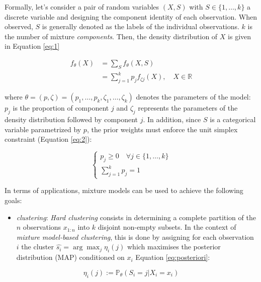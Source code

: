Formally, let's consider a pair of random variables \((X,S)\) with \(S \in \{1, \ldots, k\}\) a discrete variable and designing
the component identity of each observation. When observed, \(S\) is
generally denoted as the labels of the individual observations. \(k\) is
the number of mixture \emph{components}. Then, the density distribution of
\(X\) is given in Equation \eqref{eq:1}

\begin{equation}
\begin{split}
f_\theta(X) &= \sum_S f_\theta (X, S) \\
&= \sum_{j=1}^k p_j f_{\zeta j}(X), \quad X\in\mathbb{R}
\end{split}
\label{eq:1}
\end{equation}

where \(\theta = (p, \zeta) = (p_1, \ldots, p_k, \zeta_1, \ldots, \zeta_k)\)
denotes the parameters of the model: \(p_j\) is the proportion of
component \(j\) and \(\zeta_j\) represents the parameters of the density
distribution followed by component \(j\). In addition, since \(S\) is a categorical variable parametrized by \(p\), the prior weights must enforce the unit simplex constraint (Equation \eqref{eq:2}):

\begin{equation}
\begin{cases}
p_j \ge 0 \quad \forall j \in \{1, \ldots, k \}\\
\sum_{j=1}^k p_j =1
\end{cases}
\label{eq:2}
\end{equation}

In terms of applications, mixture models can be used to achieve the
following goals:

\begin{itemize}
\tightlist
\item
  \emph{clustering}: \emph{Hard clustering} consists in determining a complete
  partition of the \(n\) observations \(x_{1:n}\) into \(k\) disjoint
  non-empty subsets. In the context of \emph{mixture model-based
  clustering}, this is done by assigning for each observation \(i\) the
  cluster \(\hat{s_i}=\arg \max_j \eta_{i} (j)\) which maximises the
  posterior distribution (MAP) conditioned on \(x_i\) Equation
  \eqref{eq:posteriori}:
\end{itemize}

\begin{equation}
        \eta_{i} (j) := \mathbb{P}_{\theta} (S_i=j |X_i=x_i)
    \label{eq:posteriori}
\end{equation}

